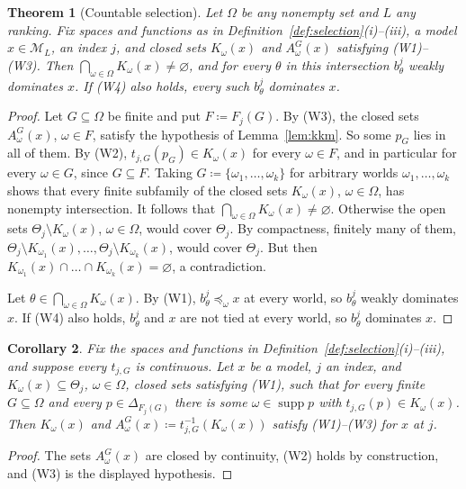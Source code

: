 \documentclass[11pt]{article}
\newtheorem{theorem}{Theorem}[section]
\newtheorem{corollary}[theorem]{Corollary}
\theoremstyle{definition}
\theoremstyle{remark}
\newcommand{\M}{\mathcal M}
\newcommand{\supp}{\operatorname{supp}}
\begin{document}
\begin{theorem}[Countable selection]\label{thm:general}
Let $\Omega$ be any nonempty set and $L$ any ranking. Fix spaces and functions as in Definition~\ref{def:selection}(i)--(iii), a model $x\in\M_L$, an index $j$, and closed sets $K_\omega(x)$ and $A^G_\omega(x)$ satisfying (W1)--(W3). Then $\bigcap_{\omega\in\Omega}K_\omega(x)\ne\varnothing$, and for every $\theta$ in this intersection $b^j_\theta$ weakly dominates $x$. If (W4) also holds, every such $b^j_\theta$ dominates $x$.
\end{theorem}
\begin{proof}
Let $G\subseteq\Omega$ be finite and put $F\coloneqq F_j(G)$. By (W3), the closed sets $A^G_\omega(x)$, $\omega\in F$, satisfy the hypothesis of Lemma~\ref{lem:kkm}. So some $p_G$ lies in all of them. By (W2), $t_{j,G}(p_G)\in K_\omega(x)$ for every $\omega\in F$, and in particular for every $\omega\in G$, since $G\subseteq F$. Taking $G\coloneqq\{\omega_1,\dots,\omega_k\}$ for arbitrary worlds $\omega_1,\dots,\omega_k$ shows that every finite subfamily of the closed sets $K_\omega(x)$, $\omega\in\Omega$, has nonempty intersection. It follows that $\bigcap_{\omega\in\Omega}K_\omega(x)\ne\varnothing$. Otherwise the open sets $\Theta_j\setminus K_\omega(x)$, $\omega\in\Omega$, would cover $\Theta_j$. By compactness, finitely many of them, $\Theta_j\setminus K_{\omega_1}(x),\dots,\Theta_j\setminus K_{\omega_k}(x)$, would cover $\Theta_j$. But then $K_{\omega_1}(x)\cap\dots\cap K_{\omega_k}(x)=\varnothing$, a contradiction.

Let $\theta\in\bigcap_{\omega\in\Omega}K_\omega(x)$. By (W1), $b^j_\theta\preceq_\omega x$ at every world, so $b^j_\theta$ weakly dominates $x$. If (W4) also holds, $b^j_\theta$ and $x$ are not tied at every world, so $b^j_\theta$ dominates $x$.
\end{proof}

\begin{corollary}\label{cor:inverse}
Fix the spaces and functions in Definition~\ref{def:selection}(i)--(iii), and suppose every $t_{j,G}$ is continuous. Let $x$ be a model, $j$ an index, and $K_\omega(x)\subseteq\Theta_j$, $\omega\in\Omega$, closed sets satisfying (W1), such that for every finite $G\subseteq\Omega$ and every $p\in\Delta_{F_j(G)}$ there is some $\omega\in\supp p$ with $t_{j,G}(p)\in K_\omega(x)$. Then $K_\omega(x)$ and $A^G_\omega(x)\coloneqq t_{j,G}^{-1}(K_\omega(x))$ satisfy (W1)--(W3) for $x$ at $j$.
\end{corollary}
\begin{proof}
The sets $A^G_\omega(x)$ are closed by continuity, (W2) holds by construction, and (W3) is the displayed hypothesis.
\end{proof}
\end{document}
